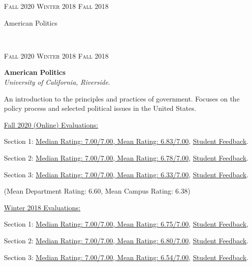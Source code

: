 \documentclass[letterpaper,11pt]{article}
\newcommand{\entry}[4]{
\ifthenelse{\isempty{#3}}
{\slimentry{#1}{#2}}{

\begin{minipage}[t]{.145\textwidth}
\flushright \textsc{#1}
\end{minipage}
\hfill\vline\hfill
\begin{minipage}[t]{.82\textwidth}
{\bf#2}\\\textit{#3}. \small{#4}
\end{minipage}\\
\vspace{.25cm}
}}
\newcommand{\slimentry}[2]{

\begin{minipage}[t]{.13\textwidth}
\hfill \textsc{#1}
\end{minipage}
\hfill\vline\hfill
\begin{minipage}[t]{.82\textwidth}
#2
\end{minipage}\\
}
\newcommand{\ucr}{University of California, Riverside}
\begin{document}
\entry{Fall 2020 Winter 2018 Fall 2018}
			{American Politics}
			{\ucr}
			{An introduction to the principles and practices of government. Focuses on the policy process and selected political issues in the United States.
			\begin{description}
				\item \underline{Fall 2020 (Online) Evaluations:}
				\item Section 1: \href{https://nrjenkins.github.io/nrjenkins.github.io/files/docs/teaching_evals/POSC010_Fall20_Section24_Scores.pdf}{Median Rating: 7.00/7.00, Mean Rating: 6.83/7.00}, \href{https://nrjenkins.github.io/nrjenkins.github.io/files/docs/teaching_evals/POSC010_Fall20_Section24_Comments.pdf}{Student Feedback}.
				\item Section 2: \href{https://nrjenkins.github.io/nrjenkins.github.io/files/docs/teaching_evals/POSC010_Fall20_Section26_Scores.pdf}{Median Rating: 7.00/7.00, Mean Rating: 6.78/7.00}, \href{https://nrjenkins.github.io/nrjenkins.github.io/files/docs/teaching_evals/POSC010_Fall20_Section26_Comments.pdf}{Student Feedback}.
				\item Section 3: \href{https://nrjenkins.github.io/nrjenkins.github.io/files/docs/teaching_evals/POSC010_Fall20_Section32_Scores.pdf}{Median Rating: 7.00/7.00, Mean Rating: 6.33/7.00}, \href{https://nrjenkins.github.io/nrjenkins.github.io/files/docs/teaching_evals/POSC010_Fall20_Section32_Comments.pdf}{Student Feedback}.
				\item (Mean Department Rating: 6.60, Mean Campus Rating: 6.38)
				\item \underline{Winter 2018 Evaluations:}
				\item Section 1: \href{https://nrjenkins.github.io/nrjenkins.github.io/files/docs/teaching_evals/POSC010_Winter19_Section24_Scores.pdf}{Median Rating: 7.00/7.00, Mean Rating: 6.75/7.00}, \href{https://nrjenkins.github.io/nrjenkins.github.io/files/docs/teaching_evals/POSC010_Winter19_Section24_Comments.pdf}{Student Feedback},
				\item Section 2: \href{https://nrjenkins.github.io/nrjenkins.github.io/files/docs/teaching_evals/POSC010_Winter19_Section25_Scores.pdf}{Median Rating: 7.00/7.00, Mean Rating: 6.80/7.00}, \href{https://nrjenkins.github.io/nrjenkins.github.io/files/docs/teaching_evals/POSC010_Winter19_Section25_Comments.pdf}{Student Feedback}.
				\item Section 3: \href{https://nrjenkins.github.io/nrjenkins.github.io/files/docs/teaching_evals/POSC010_Winter19_Section26_Scores.pdf}{Median Rating: 7.00/7.00, Mean Rating: 6.54/7.00}, \href{https://nrjenkins.github.io/nrjenkins.github.io/files/docs/teaching_evals/POSC010_Winter19_Section26_Comments.pdf}{Student Feedback}.

\end{description}}
\end{document}
